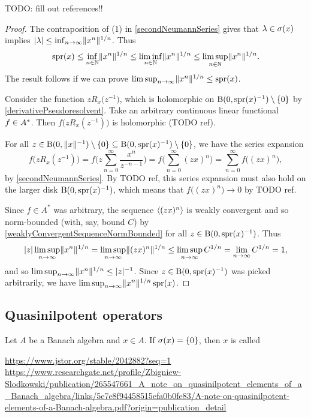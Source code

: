 TODO: fill out references!!
\begin{proof}
The contraposition of (1) in \ref{secondNeumannSeries} gives that $\lambda\in\sigma(x)$ implies $|\lambda| \leq \inf_{n\to \infty}\lVert x^n\rVert^{1/n}$. Thus
\[ \operatorname{spr}(x) \leq \inf_{n\in\mathbb{N}}\lVert x^n\rVert^{1/n} \leq \liminf_{n\in\mathbb{N}}\lVert x^n\rVert^{1/n} \leq \limsup_{n\in\mathbb{N}}\lVert x^n\rVert^{1/n}. \]
The result follows if we can prove $\limsup_{n\to\infty}\lVert x^n\rVert^{1/n}\leq \operatorname{spr}(x)$.

Consider the function $zR_x\big(z^{-1}\big)$, which is holomorphic on $\operatorname{B}(0,\operatorname{spr}(x)^{-1})\setminus\{0\}$ by \ref{derivativePseudoresolvent}. Take an arbitrary continuous linear functional $f\in {A}^*$. Then $f\big(zR_x(z^{-1})\big)$ is holomorphic (TODO ref).

For all $z\in \operatorname{B}(0,\lVert x\rVert^{-1})\setminus\{0\}\subseteq \operatorname{B}(0,\operatorname{spr}(x)^{-1})\setminus\{0\}$, we have the series expansion
\[ f\big(zR_x(z^{-1})\big) = f\Big(z\sum_{n=0}^\infty \frac{x^n}{z^{-n-1}}\Big) = f\Big(\sum_{n = 0}^\infty (zx)^n\Big) = \sum_{n = 0}^\infty f\big((zx)^n\big), \]
by \ref{secondNeumannSeries}. By TODO ref, this series expansion must also hold on the larger disk $\operatorname{B}(0,\operatorname{spr}(x)^{-1})$, which means that $f\big((zx)^n\big) \to 0$ by TODO ref.

Since $f\in A^*$ was arbitrary, the sequence $\left\langle (zx)^n \right\rangle$ is weakly convergent and so norm-bounded (with, say, bound $C$) by \ref{weaklyConvergentSequenceNormBounded} for all $z\in \operatorname{B}(0,\operatorname{spr}(x)^{-1})$. Thus
\[ |z|\limsup_{n\to\infty}\lVert x^n\rVert^{1/n} = \limsup_{n\to\infty}\lVert(zx)^n\rVert^{1/n} \leq \limsup_{n\to\infty}C^{1/n} = \lim_{n\to\infty} C^{1/n} = 1, \]
and so $\limsup_{n\to\infty}\lVert x^n\rVert^{1/n} \leq |z|^{-1}$. Since $z\in \operatorname{B}(0,\operatorname{spr}(x)^{-1})$ was picked arbitrarily, we have $\limsup_{n\to\infty}\lVert x^n\rVert^{1/n} \operatorname{spr}(x)$.
\end{proof}



\subsection{Quasinilpotent operators}
\begin{definition}
Let $A$ be a Banach algebra and $x\in A$. If $\sigma(x) = \{0\}$, then $x$ is called 
\end{definition}
\url{https://www.jstor.org/stable/2042882?seq=1}
\url{https://www.researchgate.net/profile/Zbigniew-Slodkowski/publication/265547661_A_note_on_quasinilpotent_elements_of_a_Banach_algebra/links/5e7e8f94458515efa0b0fe83/A-note-on-quasinilpotent-elements-of-a-Banach-algebra.pdf?origin=publication_detail}

